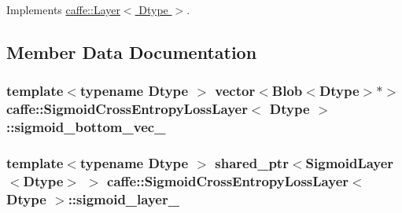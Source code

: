 Implements \hyperlink{classcaffe_1_1_layer_abd13c6489c13953b4fbcfcf6880835d0}{caffe\+::\+Layer$<$ Dtype $>$}.



\subsection{Member Data Documentation}
\hypertarget{classcaffe_1_1_sigmoid_cross_entropy_loss_layer_a52c3183799d44aa9e581992aee502409}{
\subsubsection[{sigmoid\+\_\+bottom\+\_\+vec\+\_\+}]{\setlength{\rightskip}{0pt plus 5cm}template$<$typename Dtype $>$ vector$<${\bf Blob}$<$Dtype$>$$\ast$$>$ {\bf caffe\+::\+Sigmoid\+Cross\+Entropy\+Loss\+Layer}$<$ Dtype $>$\+::sigmoid\+\_\+bottom\+\_\+vec\+\_\+\hspace{0.3cm}{\ttfamily [protected]}}}\label{classcaffe_1_1_sigmoid_cross_entropy_loss_layer_a52c3183799d44aa9e581992aee502409}
\hypertarget{classcaffe_1_1_sigmoid_cross_entropy_loss_layer_a69e0c8d2106b4b06c7c896e3069f531c}{
\subsubsection[{sigmoid\+\_\+layer\+\_\+}]{\setlength{\rightskip}{0pt plus 5cm}template$<$typename Dtype $>$ shared\+\_\+ptr$<${\bf Sigmoid\+Layer}$<$Dtype$>$ $>$ {\bf caffe\+::\+Sigmoid\+Cross\+Entropy\+Loss\+Layer}$<$ Dtype $>$\+::sigmoid\+\_\+layer\+\_\+\hspace{0.3cm}{\ttfamily [protected]}}}\label{classcaffe_1_1_sigmoid_cross_entropy_loss_layer_a69e0c8d2106b4b06c7c896e3069f531c}
